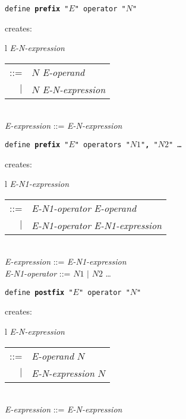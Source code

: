 \documentclass[12pt]{article}
\newcommand{\TT}[1]{{\tt \bfseries #1}}
\newenvironment{indpar}[1][0.3in]%
	{\begin{list}{}%
		     {\setlength{\itemsep}{0in}%
		      \setlength{\topsep}{0in}%
		      \setlength{\parsep}{1ex}%
		      \setlength{\labelwidth}{#1}%
		      \setlength{\leftmargin}{#1}%
		      \addtolength{\leftmargin}{\labelsep}}%
	 \item}%
	{\end{list}}
\begin{document}
\begin{indpar}

{\tt define \TT{prefix} "$E$" operator "$N$"}
\begin{indpar}
creates: \begin{tabular}[t]{l}
         {\em E-N-expression} \begin{tabular}[t]{rl}
                            ::= & $N$ {\em E-operand} \\
                            $|$ & $N$ {\em E-N-expression} \\
                            \end{tabular} \\
         {\em E-expression} ::= {\em E-N-expression} \\
	 \end{tabular}
\end{indpar}

{\tt define \TT{prefix} "$E$" operators "$N1$"\TT{,} "$N2$" \ldots}
\begin{indpar}
creates: \begin{tabular}[t]{l}
         {\em E-N1-expression} \begin{tabular}[t]{rl}
                            ::= & {\em E-N1-operator} {\em E-operand} \\
                            $|$ & {\em E-N1-operator} {\em E-N1-expression} \\
                            \end{tabular} \\
         {\em E-expression} ::= {\em E-N1-expression} \\
         {\em E-N1-operator} ::= $N1$ $|$ $N2$ \ldots \\
	 \end{tabular}
\end{indpar}

{\tt define \TT{postfix} "$E$" operator "$N$"}
\begin{indpar}
creates: \begin{tabular}[t]{l}
         {\em E-N-expression} \begin{tabular}[t]{rl}
                            ::= & {\em E-operand} $N$ \\
                            $|$ & {\em E-N-expression} $N$ \\
                            \end{tabular} \\
         {\em E-expression} ::= {\em E-N-expression} \\
	 \end{tabular}
\end{indpar}


\end{indpar}
\end{document}
